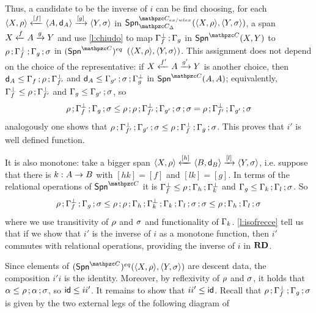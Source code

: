 Thus, a candidate to be the inverse  
of $i$ can be find choosing, for each ${\langle X,\rho \rangle } \xleftarrow{[f]} {\langle A,\mathsf{d}_A \rangle } \xrightarrow{[g]} {\langle Y,\sigma \rangle }$ in $\Span{\ct{C_{ex/wlex}}}_{\ct{C}_\Delta}(\ple{X,\eqrelr},\ple{Y,\eqrels})$, a span $X \xleftarrow{f} A \xrightarrow{g} Y$ and use \cref{l:chiudo} to map $\Gamma_{f}^{\bot}\mathop{\mathbf{;}}\Gamma_{g}$ in 
$\Span\CC(X,Y)$ to $\rho\mathop{\mathbf{;}}\Gamma_{f}^{\bot}\mathop{\mathbf{;}}\Gamma_{g}\mathop{\mathbf{;}}\sigma$ in $\EQR{\Span{\CC}}$
$({\langle X,\rho \rangle },{\langle Y,\sigma \rangle })$. This assignment does not depend on the choice of the representative: if  $X \xleftarrow{f'} A \xrightarrow{g'} Y$ is another choice, then $\mathsf{d}_A\leq\Gamma_{f}\mathop{\mathbf{;}}\rho\mathop{\mathbf{;}}\Gamma_{f'}^{\bot}$ and $\mathsf{d}_A\leq\Gamma_{g'}\mathop{\mathbf{;}}\sigma\mathop{\mathbf{;}}\Gamma_{g}^{\bot}$ in $\Span{\CC}(A,A)$; equivalently, $\Gamma_{f}^{\bot}\leq\rho\mathop{\mathbf{;}}\Gamma_{f'}^{\bot}$ and $\Gamma_{g}\leq\Gamma_{g'}\mathop{\mathbf{;}}\sigma$, so
\[
\rho\mathop{\mathbf{;}}\Gamma_{f}^{\bot}\mathop{\mathbf{;}}\Gamma_{g}\mathop{\mathbf{;}}\sigma
\leq
\rho\mathop{\mathbf{;}}\rho\mathop{\mathbf{;}}\Gamma_{f'}^{\bot}\mathop{\mathbf{;}}\Gamma_{g'}\mathop{\mathbf{;}}\sigma\mathop{\mathbf{;}}\sigma
=
\rho\mathop{\mathbf{;}}\Gamma_{f'}^{\bot}\mathop{\mathbf{;}}\Gamma_{g'}\mathop{\mathbf{;}}\sigma
\]
analogously one shows that $\rho\mathop{\mathbf{;}}\Gamma_{f'}^{\bot}\mathop{\mathbf{;}}\Gamma_{g'}\mathop{\mathbf{;}}\sigma\leq\rho\mathop{\mathbf{;}}\Gamma_{f}^{\bot}\mathop{\mathbf{;}}\Gamma_{g}\mathop{\mathbf{;}}\sigma$. This proves that $i'$ is well defined function.

 It is also monotone: take a bigger span ${\langle X,\rho \rangle } \xleftarrow{[h]} {\langle B,\mathsf{d}_B \rangle } \xrightarrow{[l]} {\langle Y,\sigma \rangle }$, i.e. suppose that there is $\fun{k}{A}{B}$ with $[hk]=[f]$ and $[lk]=[g]$. In terms of the relational operations of $\Span{\CC}$ it is $\Gamma_{f}^{\bot}\leq \rho\mathop{\mathbf{;}}\Gamma_{h}\mathop{\mathbf{;}}\Gamma_{k}^{\bot}$
 and $\Gamma_{g}\leq \Gamma_{k}\mathop{\mathbf{;}}\Gamma_{l}\mathop{\mathbf{;}}\sigma$. So
 \[
 \rho\mathop{\mathbf{;}}\Gamma_{f}^{\bot}\mathop{\mathbf{;}}\Gamma_{g}\mathop{\mathbf{;}}\sigma
 \leq
 \rho\mathop{\mathbf{;}}\rho\mathop{\mathbf{;}}\Gamma_{h}\mathop{\mathbf{;}}\Gamma_{k}^{\bot}\mathop{\mathbf{;}}\Gamma_{k}\mathop{\mathbf{;}}\Gamma_{l}\mathop{\mathbf{;}}\sigma\mathop{\mathbf{;}}\sigma
 \leq
 \rho\mathop{\mathbf{;}}\Gamma_{h}\mathop{\mathbf{;}}\Gamma_{l}\mathop{\mathbf{;}}\sigma
 \]
where we use transitivity of $\rho$ and $\sigma$ and functionality of $\Gamma_{k}$. 
\cref{l:isofrecce} tell us that if we show that $i'$ is the inverse of $i$ as a monotone function, then $i'$ commutes with relational operations, providing the inverse of $i$ in $\mathbf{RD}$.

Since elements of $\EQR{\Span\CC}(\ple{X,\eqrelr},\ple{Y,\eqrels})$ are descent data, the composition $i'i$ is the identity. Moreover, by reflexivity of $\rho$ and $\sigma$, it holds that  $\alpha\leq \rho\mathop{\mathbf{;}}\alpha\mathop{\mathbf{;}}\sigma$, so $\mathsf{id}\leq ii'$. It remains to show that $ii'\leq\mathsf{id}$.
 Recall that $\rho\mathop{\mathbf{;}}\Gamma_{f}^{\bot}\mathop{\mathbf{;}}\Gamma_{g}\mathop{\mathbf{;}}\sigma$ is given by the two external legs of the following diagram of \CC

